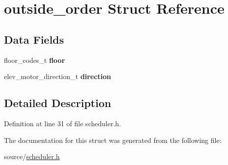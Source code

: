\hypertarget{structoutside__order}{}\section{outside\+\_\+order Struct Reference}
\label{structoutside__order}
\subsection*{Data Fields}
\begin{DoxyCompactItemize}
\item 
floor\+\_\+codes\+\_\+t {\bfseries floor}\hypertarget{structoutside__order_a46a26592b06dc0c6c95462014a8087c2}{}\label{structoutside__order_a46a26592b06dc0c6c95462014a8087c2}

\item 
elev\+\_\+motor\+\_\+direction\+\_\+t {\bfseries direction}\hypertarget{structoutside__order_a542a2b3f86ab377e9cff750de95e1fe3}{}\label{structoutside__order_a542a2b3f86ab377e9cff750de95e1fe3}

\end{DoxyCompactItemize}


\subsection{Detailed Description}


Definition at line 31 of file scheduler.\+h.



The documentation for this struct was generated from the following file\+:\begin{DoxyCompactItemize}
\item 
source/\hyperlink{scheduler_8h}{scheduler.\+h}\end{DoxyCompactItemize}
